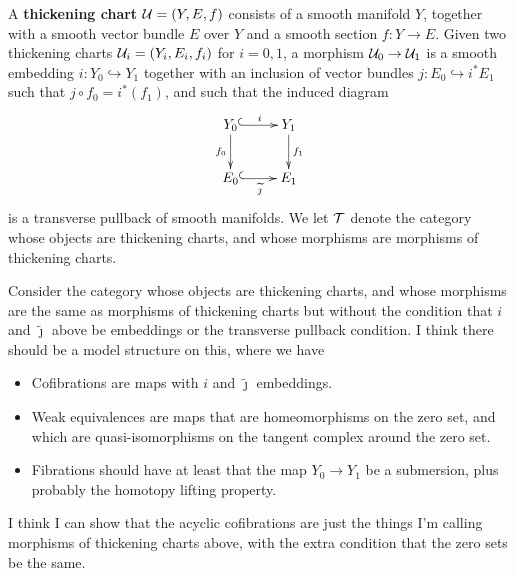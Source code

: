 \begin{definition}\label{thickening-charts}
A {\bf thickening chart}  $\mathcal U = (Y, E, f)$ consists of a smooth manifold $Y$, together with a smooth vector bundle $E$ over $Y$ and a smooth section $f: Y \to E$. Given two thickening charts $\mathcal U_i = (Y_i, E_i, f_i)$ for $i = 0, 1$, a morphism $\mathcal U_0 \to \mathcal U_1$ is a smooth embedding $i: Y_0 \hookrightarrow Y_1$ together with an inclusion of vector bundles $j: E_0 \hookrightarrow i^* E_1$ such that $j \circ f_0 = i^*(f_1)$, and such that the induced diagram
\[\xymatrix{
		Y_0 \ar[d]_-{f_0} \ar@{^{(}->}[r]^-{i} & Y_1 \ar[d]^-{f_1} \\
		E_0 \ar@{^{(}->}[r]_-{\widetilde{\jmath}} & E_1}\]
is a transverse pullback of smooth manifolds. We let $\mathcal T$ denote the category whose objects are thickening charts, and whose morphisms are  morphisms of thickening charts.
\end{definition}

\begin{wild-speculation}\label{model-category}
Consider the category whose objects are thickening charts, and whose morphisms are the same as morphisms of thickening charts but without the condition that $i$ and $\widetilde{\jmath}$ above be embeddings or the transverse pullback condition. I think there should be a model structure on this, where we have
\begin{itemize}

\item Cofibrations are maps with $i$ and $\widetilde{\jmath}$ embeddings.

\item Weak equivalences are maps that are homeomorphisms on the zero set, and which are quasi-isomorphisms on the tangent complex \jake{[to be defined]} around the zero set.

\item Fibrations should have at least that the map $Y_0 \to Y_1$ be a submersion, plus probably the homotopy lifting property.

\end{itemize}
I think I can show that the acyclic cofibrations are just the things I'm calling morphisms of thickening charts above, with the extra condition that the zero sets be the same.
\end{wild-speculation}

\begin{remark}
\end{remark}

